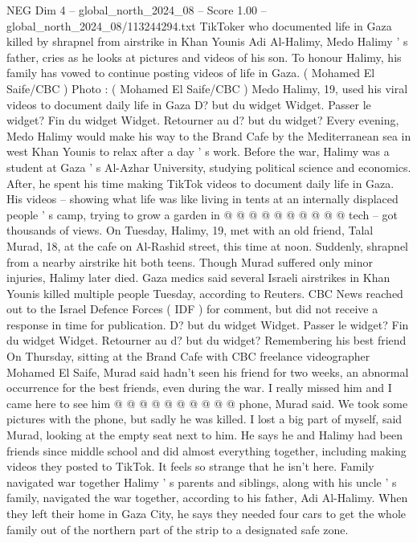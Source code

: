 \begin{textsample}{NEG Dim 4 – global\_north\_2024\_08 – Score 1.00 – global\_north\_2024\_08/113244294.txt}  \label{ex:f4_neg_298}
TikToker who documented life in Gaza killed by shrapnel from airstrike in Khan Younis Adi Al-Halimy, Medo Halimy ' s father, cries as he looks at pictures and videos of his son.
To honour Halimy, his family has vowed to continue posting videos of life in Gaza. ( Mohamed El Saife/CBC ) Photo : ( Mohamed El Saife/CBC ) Medo Halimy, 19, used his viral videos to document daily life in Gaza D? but du widget Widget.
Passer le widget?
Fin du widget Widget.
Retourner au d? but du widget?
Every evening, Medo Halimy would make his way to the Brand Cafe by the Mediterranean sea in west Khan Younis to relax after a day ' s work.
Before the war, Halimy was a student at Gaza ' s Al-Azhar University, studying political science and economics.
After, he spent his time making TikTok videos to document daily life in Gaza.
His videos -- showing what life was like living in tents at an internally displaced people ' s camp, trying to grow a garden in @ @ @ @ @ @ @ @ @ @ tech -- got thousands of views.
On Tuesday, Halimy, 19, met with an old friend, Talal Murad, 18, at the cafe on Al-Rashid street, this time at noon.
Suddenly, shrapnel from a nearby airstrike hit both teens.
Though Murad suffered only minor injuries, Halimy later died.
Gaza medics said several Israeli airstrikes in Khan Younis killed multiple people Tuesday, according to Reuters.
CBC News reached out to the Israel Defence Forces ( IDF ) for comment, but did not receive a response in time for publication.
D? but du widget Widget.
Passer le widget?
Fin du widget Widget.
Retourner au d? but du widget?
Remembering his best friend On Thursday, sitting at the Brand Cafe with CBC freelance videographer Mohamed El Saife, Murad said hadn't seen his friend for two weeks, an abnormal occurrence for the best friends, even during the war.
I really missed him and I came here to see him @ @ @ @ @ @ @ @ @ @ phone, Murad said.
We took some pictures with the phone, but sadly he was killed.
I lost a big part of myself, said Murad, looking at the empty seat next to him.
He says he and Halimy had been friends since middle school and did almost everything together, including making videos they posted to TikTok.
It feels so strange that he isn't here.
Family navigated war together Halimy ' s parents and siblings, along with his uncle ' s family, navigated the war together, according to his father, Adi Al-Halimy.
When they left their home in Gaza City, he says they needed four cars to get the whole family out of the northern part of the strip to a designated safe zone.

\end{textsample}
